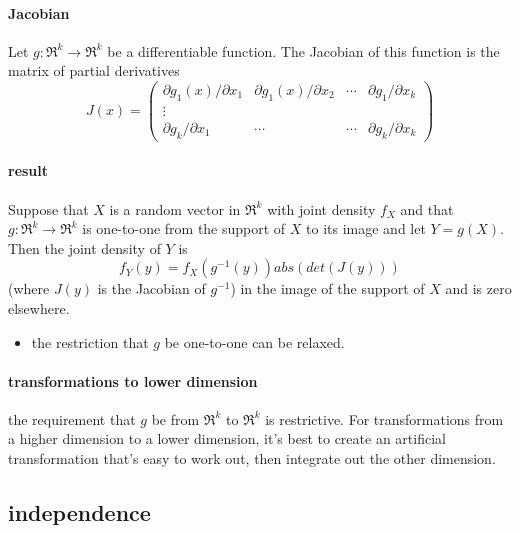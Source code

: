 \paragraph{Jacobian}
      Let $g: \Re^k \to \Re^k$ be a differentiable function.  The
      Jacobian of this function is the matrix of partial derivatives
      \[ J(x) = \begin{pmatrix} \partial g_1(x) / \partial x_1 & \partial
      g_1(x) / \partial x_2 & \cdots & \partial g_1 / \partial x_k \\
      \vdots \\ \partial g_k / \partial x_1 & \cdots & \cdots & \partial g_k /
      \partial x_k \end{pmatrix} \]

\paragraph{result \citep[B.7.7]{Gre_2011}}
      Suppose that $X$ is a random vector in $\Re^k$ with joint
      density $f_X$ and that $g: \Re^k \to \Re^k$ is one-to-one from
      the support of $X$ to its image and let $Y = g(X)$.  Then the
      joint density of $Y$ is \[ f_Y(y) = f_X(g^{-1}(y)) abs(det( J(y)
      ))\] (where $J(y)$ is the Jacobian of $g^{-1}$) in the image of
      the support of $X$ and is zero elsewhere.
\begin{itemize}
\item the restriction that $g$ be one-to-one can be relaxed.
\end{itemize}

\paragraph{transformations to lower dimension}
      the requirement that $g$ be from $\Re^k$ to $\Re^k$ is restrictive.
      For transformations from a higher dimension to a lower dimension,
      it's best to create an artificial transformation that's easy to
      work out, then integrate out the other dimension.

\subsection{independence}

